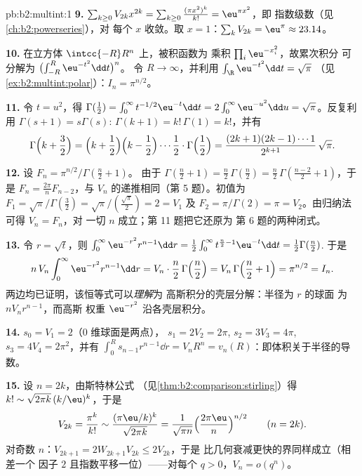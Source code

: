 \begin{solution}{pb:b2:multint:1}
\textbf{9.} $\sum_{k\geq0}V_{2k}x^{2k} =
\sum_{k\geq0}\frac{(\pi x^2)^k}{k!} = \eu^{\pi x^2}$，即
指数级数（见\cref{ch:b2:powerseries}），对
每个 $x$ 收敛。取 $x = 1$：$\sum_kV_{2k} = \eu^\pi \approx
23.14$。

\textbf{10.} 在立方体 $\intcc{-R}R^n$ 上，被积函数为
乘积 $\prod_i\eu^{-x_i^2}$，故累次积分
可分解为 $\bigl(\int_{-R}^R\eu^{-t^2}\dd t\bigr)^n$。
令 $R \to \infty$，并利用
$\int_\R\eu^{-t^2}\dd t = \sqrt\pi$
（见\cref{ex:b2:multint:polar}）：$I_n = \pi^{n/2}$。

\textbf{11.} 令 $t = u^2$，得 $\Gamma(\tfrac12) =
\int_0^\infty t^{-1/2}\eu^{-t}\dd t =
2\int_0^\infty\eu^{-u^2}\dd u = \sqrt\pi$。反复利用
$\Gamma(s+1) = s\Gamma(s)$: $\Gamma(k+1) = k!\,\Gamma(1) =
k!$，并有
\[
\Gamma\Bigl(k + \frac32\Bigr)
= \Bigl(k + \frac12\Bigr)\Bigl(k - \frac12\Bigr)\cdots
\frac12\cdot\Gamma\Bigl(\frac12\Bigr)
= \frac{(2k+1)(2k-1)\cdots1}{2^{k+1}}\,\sqrt\pi .
\]

\textbf{12.} 设 $F_n = \pi^{n/2}/\Gamma(\frac n2 + 1)$。
由于 $\Gamma(\frac n2 + 1) = \frac n2\,\Gamma(\frac n2) =
\frac n2\,\Gamma(\frac{n-2}2 + 1)$，于是 $F_n =
\frac{2\pi}nF_{n-2}$，与 $V_n$ 的递推相同（第
5 题）。初值为 $F_1 = \sqrt\pi/\Gamma(\frac32) =
\sqrt\pi/(\frac{\sqrt\pi}2) = 2 = V_1$ 及 $F_2 =
\pi/\Gamma(2) = \pi = V_2$。由归纳法可得 $V_n = F_n$，对
一切 $n$ 成立；第 11 题把它还原为
第 6 题的两种闭式。

\textbf{13.} 令 $r = \sqrt t$，则 $\int_0^\infty
\eu^{-r^2}r^{n-1}\dd r = \frac12\int_0^\infty
t^{\frac n2 - 1}\eu^{-t}\dd t = \frac12\Gamma(\frac n2)$.
于是
\[
n\,V_n\int_0^\infty\eu^{-r^2}r^{n-1}\dd r
= V_n\cdot\frac n2\,\Gamma\Bigl(\frac n2\Bigr)
= V_n\,\Gamma\Bigl(\frac n2 + 1\Bigr) = \pi^{n/2} = I_n .
\]
两边均已证明，该恒等式可以\emph{理解}为
高斯积分的壳层分解：半径为 $r$ 的球面
为 $nV_nr^{n-1}$，而高斯
权重 $\eu^{-r^2}$ 沿各壳层积分。

\textbf{14.} $s_0 = V_1 = 2$（$0$ 维球面是两点），
$s_1 = 2V_2 = 2\pi$, $s_2 = 3V_3 = 4\pi$, $s_3 = 4V_4 =
2\pi^2$，并有 $\int_0^R s_{n-1}r^{n-1}\dd r = V_nR^n =
v_n(R)$：即体积关于半径的导数。

\textbf{15.} 设 $n = 2k$，由斯特林公式
（见\cref{thm:b2:comparison:stirling}）得 $k! \sim
\sqrt{2\pi k}\,(k/\eu)^k$，于是
\[
V_{2k} = \frac{\pi^k}{k!}
\sim \frac{(\pi\eu/k)^k}{\sqrt{2\pi k}}
= \frac1{\sqrt{\pi n}}\Bigl(\frac{2\pi\eu}n\Bigr)^{n/2}
\qquad (n = 2k).
\]
对奇数 $n$：$V_{2k+1} = 2W_{2k+1}V_{2k} \leq 2V_{2k}$，于是
比几何衰减更快的界同样成立（相差一个
因子 $2$ 且指数平移一位）——对每个 $q >
0$，$V_n = o(q^n)$。


\end{solution}
